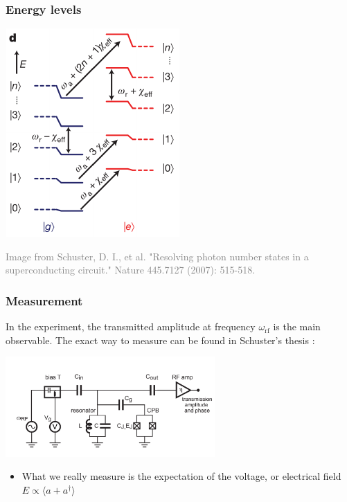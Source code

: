 \documentclass[xcolor=dvipsnames,hyperref={CJKbookmarks=true},aspectratio=169]{beamer}
\newcommand{\rf}{\text{rf}}
\begin{document}
\begin{frame}[t]\frametitle{Energy levels}
\begin{center}
	\includegraphics[height=0.85\textheight]{energy_levels.pdf}
\end{center}
\tiny{\textcolor{gray}{Image from Schuster, D. I., et al. "Resolving photon number states in a superconducting circuit." Nature 445.7127 (2007): 515-518.\cite{schuster2007resolving}}}
\end{frame}

\begin{frame}[t]\frametitle{Measurement}
In the experiment, the transmitted amplitude at frequency $\omega_{\rf}$ is the 
main observable. The exact way to measure can be found in Schuster's thesis \cite{schuster2007circuit}: 
\begin{center}
  \includegraphics[width=0.6\textwidth]{measurement.png}
\end{center}
	\begin{itemize}
		\item What we really measure is the expectation of the voltage, or 
		electrical field $E\propto\langle a + a^\dag \rangle$
	\end{itemize}
\end{frame}
\end{document}
